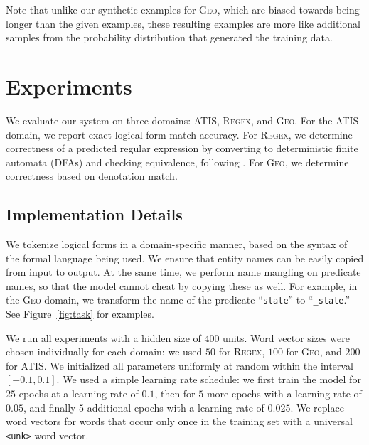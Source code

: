 \documentclass[11pt,letterpaper]{article}
\newcommand{\atis}{\textsc{ATIS}\xspace}
\newcommand{\regex}{\textsc{Regex}\xspace}
\newcommand{\geo}{\textsc{Geo}\xspace}
\newcommand\pl[1]{}
\newcommand\rj[1]{}
\begin{document}
Note that unlike our synthetic examples for \geo, which are biased
towards being longer than the given examples, these resulting examples
are more like additional samples from the probability distribution
that generated the training data.

%

\section{Experiments}
We evaluate our system on three domains: \atis, \regex, and \geo.
For the \atis domain, we report exact logical form match accuracy.
For \regex, we determine correctness of a predicted regular expression
by converting to deterministic finite automata (DFAs)
and checking equivalence, following .
For \geo, we determine correctness based on denotation match.

\subsection{Implementation Details}
We tokenize logical forms in a domain-specific manner,
based on the syntax of the formal language being used.
We ensure that entity names can be easily copied from input to output.
At the same time, we perform name mangling on predicate names,
so that the model cannot cheat by copying these as well.
For example, in the \geo domain, we transform the name
of the predicate ``\texttt{state}'' to ``\texttt{\_state}.''
See Figure~\ref{fig:task} for examples.

We run all experiments with a hidden size of $400$ units.
Word vector sizes were chosen individually for each domain:
we used $50$ for \regex, $100$ for \geo, and $200$ for \atis.
We initialized all parameters uniformly at random 
within the interval $[-0.1, 0.1]$.
We used a simple learning rate schedule:
we first train the model for $25$ epochs at a learning rate of $0.1$,
then for $5$ more epochs with a learning rate of $0.05$,
and finally $5$ additional epochs with a learning rate of $0.025$.
We replace word vectors for words that occur only once in the training set 
with a universal \texttt{<unk>} word vector.
\end{document}
